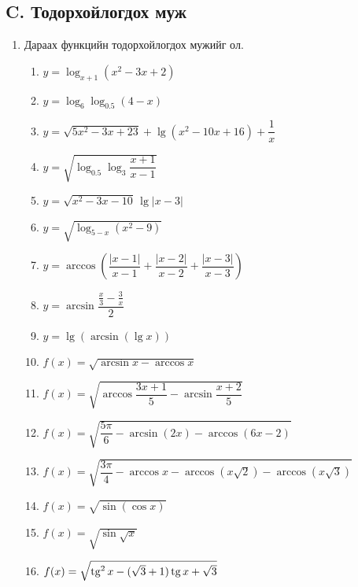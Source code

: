 \subsection*{C. Тодорхойлогдох муж}
\begin{enumerate}[resume]
\item Дараах функцийн тодорхойлогдох мужийг ол.
\begin{enumerate}
  \item $y=\log_{x+1}(x^2-3x+2)$
  \item $y=\log_6\log_{0.5}(4-x)$
  \item $y=\sqrt{5x^2-3x+23}+\lg(x^2-10x+16)+\dfrac1x$
  \item $y=\sqrt{\log_{0.5}\log_3\dfrac{x+1}{x-1}}$
  \item $y=\sqrt{x^2-3x-10}\,\lg|x-3|$
  \item $y=\sqrt{\log_{5-x}(x^2-9)}$
  \item $y=\arccos\!\left(\dfrac{|x-1|}{x-1}+\dfrac{|x-2|}{x-2}+\dfrac{|x-3|}{x-3}\right)$
  \item $y=\arcsin\dfrac{\frac x3-\frac3x}{2}$
  \item $y=\lg(\arcsin(\lg x))$
  \item $f(x)=\sqrt{\arcsin x-\arccos x}$
  \item $f(x)=\sqrt{\arccos\dfrac{3x+1}{5}-\arcsin\dfrac{x+2}{5}}$
  \item $f(x)=\sqrt{\dfrac{5\pi}{6}-\arcsin(2x)-\arccos(6x-2)}$
  \item $f(x)=\sqrt{\dfrac{3\pi}{4}-\arccos x-\arccos(x\sqrt2)-\arccos(x\sqrt3)}$
  \item $f(x)=\sqrt{\sin(\cos x)}$
  \item $f(x)=\sqrt{\sin\sqrt{x}}$
  \item $f(x)=\sqrt{\operatorname{tg}^2x-(\sqrt3+1)\operatorname{tg} x+\sqrt3}$
\end{enumerate}
\end{enumerate}

